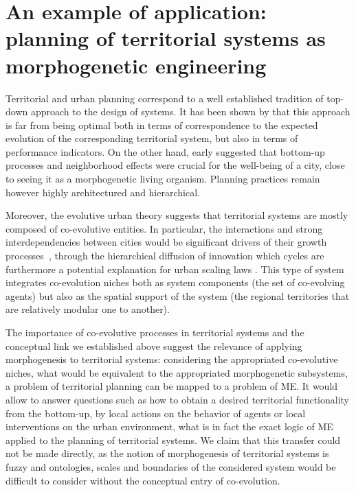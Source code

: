 \documentclass[letterpaper]{article}
\begin{document}
\section{An example of application: planning of territorial systems as morphogenetic engineering}


Territorial and urban planning correspond to a well established tradition of top-down approach to the design of systems. It has been shown by \cite{hall1982great} that this approach is far from being optimal both in terms of correspondence to the expected evolution of the corresponding territorial system, but also in terms of performance indicators. On the other hand, \cite{jane1961death} early suggested that bottom-up processes and neighborhood effects were crucial for the well-being of a city, close to seeing it as a morphogenetic living organism. Planning practices remain however highly architectured and hierarchical.

Moreover, the evolutive urban theory \citep{pumain1997pour} suggests that territorial systems are mostly composed of co-evolutive entities. In particular, the interactions and strong interdependencies between cities would be significant drivers of their growth processes~\citep{doi:10.1177/0042098010377366}, through the hierarchical diffusion of innovation which cycles are furthermore a potential explanation for urban scaling laws \citep{pumain2006evolutionary}. This type of system integrates co-evolution niches both as system components (the set of co-evolving agents) but also as the spatial support of the system (the regional territories that are relatively modular one to another).

The importance of co-evolutive processes in territorial systems and the conceptual link we established above suggest the relevance of applying morphogenesis to territorial systems: considering the appropriated co-evolutive niches, what would be equivalent to the appropriated morphogenetic subsystems, a problem of territorial planning can be mapped to a problem of ME. It would allow to answer questions such as how to obtain a desired territorial functionality from the bottom-up, by local actions on the behavior of agents or local interventions on the urban environment, what is in fact the exact logic of ME applied to the planning of territorial systems. We claim that this transfer could not be made directly, as the notion of morphogenesis of territorial systems is fuzzy and ontologies, scales and boundaries of the considered system would be difficult to consider without the conceptual entry of co-evolution.
\end{document}
